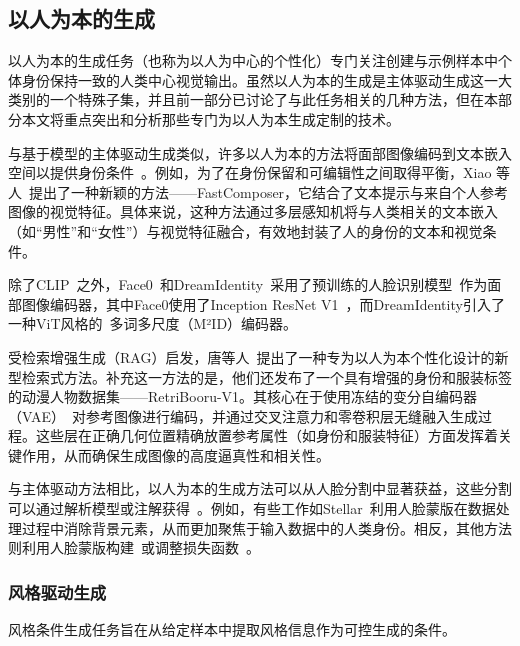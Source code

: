 \subsection{以人为本的生成}
\label{sec:person}
以人为本的生成任务（也称为以人为中心的个性化）专门关注创建与示例样本中个体身份保持一致的人类中心视觉输出。虽然以人为本的生成是主体驱动生成这一大类别的一个特殊子集，并且前一部分已讨论了与此任务相关的几种方法，但在本部分本文将重点突出和分析那些专门为以人为本生成定制的技术。

与基于模型的主体驱动生成类似，许多以人为本的方法将面部图像编码到文本嵌入空间以提供身份条件~\cite{xiao2023fastcomposer,valevski2023face0,chen2023dreamidentity,chen2023photoverse,ruiz2023hyperdreambooth}。例如，为了在身份保留和可编辑性之间取得平衡，Xiao 等人~\cite{xiao2023fastcomposer}提出了一种新颖的方法——FastComposer，它结合了文本提示与来自个人参考图像的视觉特征。具体来说，这种方法通过多层感知机将与人类相关的文本嵌入（如“男性”和“女性”）与视觉特征融合，有效地封装了人的身份的文本和视觉条件。

除了CLIP~\cite{radford2021learning}之外，Face0~\cite{valevski2023face0}和DreamIdentity~\cite{chen2023dreamidentity}采用了预训练的人脸识别模型~\cite{cao2018vggface2}作为面部图像编码器，其中Face0使用了Inception ResNet V1~\cite{szegedy2017inception}，而DreamIdentity引入了一种ViT风格的~\cite{dosovitskiy2020image}多词多尺度（M²ID）编码器。

受检索增强生成（RAG）启发，唐等人~\cite{tang2023retrieving}提出了一种专为以人为本个性化设计的新型检索式方法。补充这一方法的是，他们还发布了一个具有增强的身份和服装标签的动漫人物数据集——RetriBooru-V1。其核心在于使用冻结的变分自编码器（VAE）~\cite{kingma2013auto}对参考图像进行编码，并通过交叉注意力和零卷积层无缝融入生成过程。这些层在正确几何位置精确放置参考属性（如身份和服装特征）方面发挥着关键作用，从而确保生成图像的高度逼真性和相关性。

与主体驱动方法相比，以人为本的生成方法可以从人脸分割中显著获益，这些分割可以通过解析模型或注解获得~\cite{xiao2023fastcomposer,chen2023photoverse,li2023photomaker,achlioptas2023stellar,peng2023portraitbooth}。例如，有些工作如Stellar~\cite{achlioptas2023stellar}利用人脸蒙版在数据处理过程中消除背景元素，从而更加聚焦于输入数据中的人类身份。相反，其他方法则利用人脸蒙版构建~\cite{xiao2023fastcomposer,chen2023photoverse,li2023photomaker,peng2023portraitbooth}或调整损失函数~\cite{hyung2023magicapture}。

\subsubsection{风格驱动生成}
风格条件生成任务旨在从给定样本中提取风格信息作为可控生成的条件。

